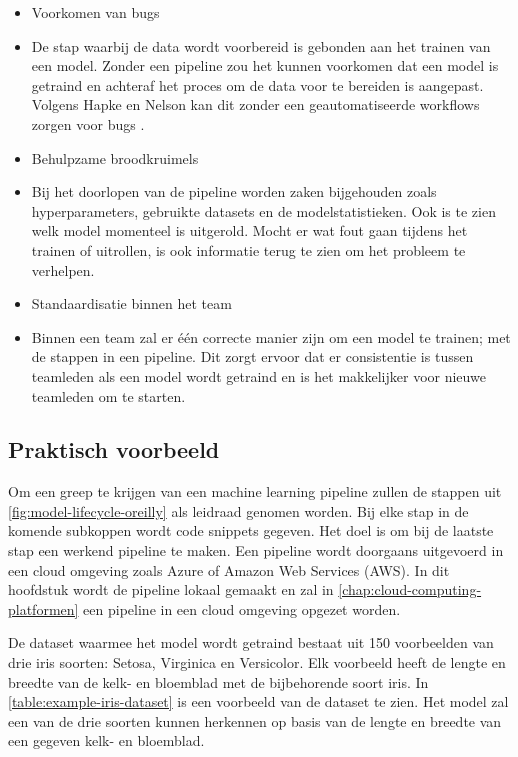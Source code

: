 \begin{itemize}
  \item Voorkomen van bugs
  \item[] De stap waarbij de data wordt voorbereid is gebonden aan het trainen van een model. Zonder een pipeline zou het kunnen voorkomen dat een model is getraind en achteraf het proces om de data voor te bereiden is aangepast. Volgens Hapke en Nelson kan dit zonder een geautomatiseerde workflows zorgen voor bugs \cite[p.~2]{building-machine-learning-pipelines-oreilly}.
  \item Behulpzame broodkruimels
  \item[] Bij het doorlopen van de pipeline worden zaken bijgehouden zoals hyperparameters, gebruikte datasets en de modelstatistieken. Ook is te zien welk model momenteel is uitgerold. Mocht er wat fout gaan tijdens het trainen of uitrollen, is ook informatie terug te zien om het probleem te verhelpen.
  \item Standaardisatie binnen het team
  \item[] Binnen een team zal er één correcte manier zijn om een model te trainen; met de stappen in een pipeline. Dit zorgt ervoor dat er consistentie is tussen teamleden als een model wordt getraind en is het makkelijker voor nieuwe teamleden om te starten.
\end{itemize}

\subsection{Praktisch voorbeeld}\label{subsec:praktisch-voorbeeld}
Om een greep te krijgen van een machine learning pipeline zullen de stappen uit \autoref{fig:model-lifecycle-oreilly} als leidraad genomen worden. Bij elke stap in de komende subkoppen wordt code snippets gegeven. Het doel is om bij de laatste stap een werkend pipeline te maken. Een pipeline wordt doorgaans uitgevoerd in een cloud omgeving zoals Azure of Amazon Web Services (AWS). In dit hoofdstuk wordt de pipeline lokaal gemaakt en zal in \autoref{chap:cloud-computing-platformen} een pipeline in een cloud omgeving opgezet worden. 

De dataset waarmee het model wordt getraind bestaat uit 150 voorbeelden van drie iris soorten: Setosa, Virginica en Versicolor. Elk voorbeeld heeft de lengte en breedte van de kelk- en bloemblad met de bijbehorende soort iris. In \autoref{table:example-iris-dataset} is een voorbeeld van de dataset te zien. Het model zal een van de drie soorten kunnen herkennen op basis van de lengte en breedte van een gegeven kelk- en bloemblad. 

